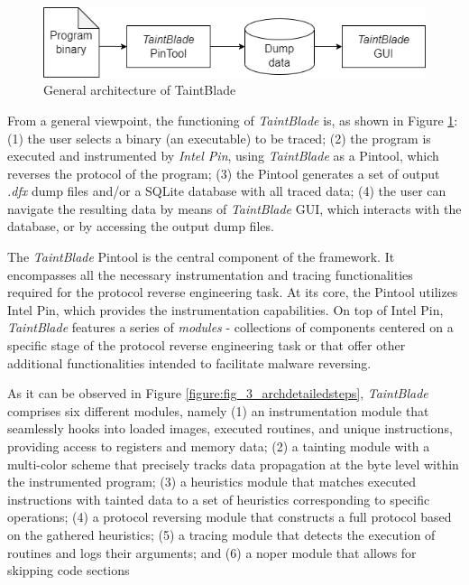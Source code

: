 \documentclass[conference]{IEEEtran}
\begin{document}
\begin{figure}[htbp]
    \centerline{\includegraphics[width=0.9\columnwidth]{images/generalarch.drawio.png}}
    \caption{General architecture of TaintBlade}
    \label{fig_3_generalarch}
\end{figure}

From a general viewpoint, the functioning of \textit{TaintBlade} is, as shown
in Figure \ref{fig_3_generalarch}: (1) the user selects a binary (an
executable) to be traced; (2) the program is executed and instrumented by
\textit{Intel Pin}, using \textit{TaintBlade} as a Pintool, which reverses the
protocol of the program; (3) the Pintool generates a set of output
\textit{.dfx} dump files and/or a SQLite database with all traced data; (4) the
user can navigate the resulting data by means of \textit{TaintBlade} GUI, which
interacts with the database, or by accessing the output dump files.

The \textit{TaintBlade} Pintool is the central component of the framework. It
encompasses all the necessary instrumentation and tracing functionalities
required for the protocol reverse engineering task. At its core, the Pintool
utilizes Intel Pin, which provides the instrumentation capabilities. On top of
Intel Pin, \textit{TaintBlade} features a series of \textit{modules} -
collections of components centered on a specific stage of the protocol reverse
engineering task or that offer other additional functionalities intended to
facilitate malware reversing.

As it can be observed in Figure \ref{figure:fig_3_archdetailedsteps},
\textit{TaintBlade} comprises six different modules, namely (1) an
instrumentation module that seamlessly hooks into loaded images, executed routines, 
and unique instructions, providing access to registers and memory data; 
(2) a tainting module with a multi-color scheme that precisely tracks data propagation 
at the byte level within the instrumented program; (3) a heuristics module that matches executed
instructions with tainted data to a set of heuristics corresponding to specific
operations; (4) a protocol reversing module that constructs a full protocol
based on the gathered heuristics; (5) a tracing module that detects the execution 
of routines and logs their arguments; and (6) a noper module
that allows for skipping code sections 
\end{document}
